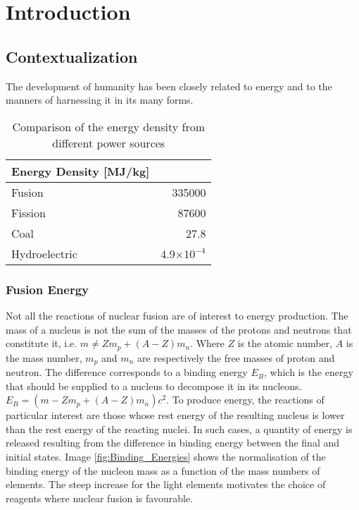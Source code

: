 \chapter{Introduction}


\section{Contextualization}

The development of humanity has been closely related to energy and to the manners of harnessing it in its many forms. 


\begin{table}
\centering
\caption{Comparison of the energy density from different power sources}
\label{tab:comparison_energy}
\begin{tabular}{lr}
\toprule
  Energy Density [MJ/kg]\\ 
\hline
\rule[-1ex]{0pt}{3ex} Fusion & 335000 \\  
\rule[-1ex]{0pt}{3ex} Fission & 87600\\  
\rule[-1ex]{0pt}{3ex} Coal & 27.8  \\ 
\rule[-1ex]{0pt}{3ex} Hydroelectric & 4.9$\times 10^{-4}$ \\ 
\hline
\end{tabular}  
\end{table}


\subsection{Fusion Energy}
Not all the reactions of nuclear fusion are of interest to energy production. The mass of a nucleus is not the sum of the masses of the protons and neutrons that constitute it, i.e. $m \neq Z m_p + (A-Z) m_n$. Where $Z$ is the atomic number, $A$ is the mass number, $m_p$ and $m_n$ are respectively the free masses of proton and neutron. The difference corresponds to a binding energy $E_B$, which is the energy that should be supplied to a nucleus to decompose it in its nucleons. $E_B = (m - Z m_p + (A-Z) m_n) c^2$. To produce energy, the reactions of particular interest are those whose rest energy of the resulting nucleus is lower than the rest energy of the reacting nuclei. In such cases, a quantity of energy is released resulting from the difference in binding energy between the final and initial states. Image \ref{fig:Binding_Energies} shows the normalisation of the binding energy of the nucleon mass as a function of the mass numbers of elements. The steep increase for the light elements motivates the choice of reagents where nuclear fusion is favourable. 


